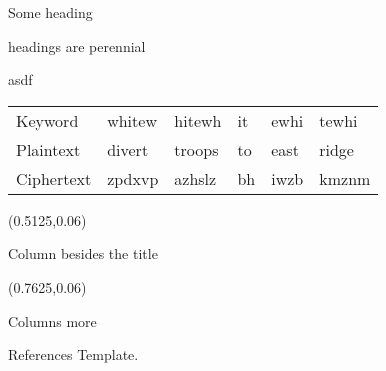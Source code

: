 \documentclass[final]{beamer}
\begin{document}
\begin{frame}{\hfill Some heading}
\begin{textblock}{0.225}
\begin{block}{headings are perennial}
      \lipsum[1]
    \end{block}

    \begin{block}{asdf}
      \lipsum[1]
      \begin{center}
        \begin{tabular}{l*{5}l}
          Keyword  &whitew &hitewh& it &ewhi& tewhi\\
          Plaintext&  divert&troops& to &east& ridge\\
          Ciphertext&  zpdxvp& azhslz& bh &iwzb &kmznm\\
        \end{tabular}
      \end{center}
    \end{block}

  \end{textblock}    

  \begin{textblock}{0.225}(0.5125,0.06)
    \begin{block}{Column besides the title}
      \lipsum[50]
    \end{block}
  \end{textblock}    
  
  \begin{textblock}{0.225}(0.7625,0.06)
    \begin{block}{Columns more}
\lipsum[100]
    \end{block}

    \begin{block}{References}
      Template.
    \end{block}
  \end{textblock}

\end{frame}
\end{document}
